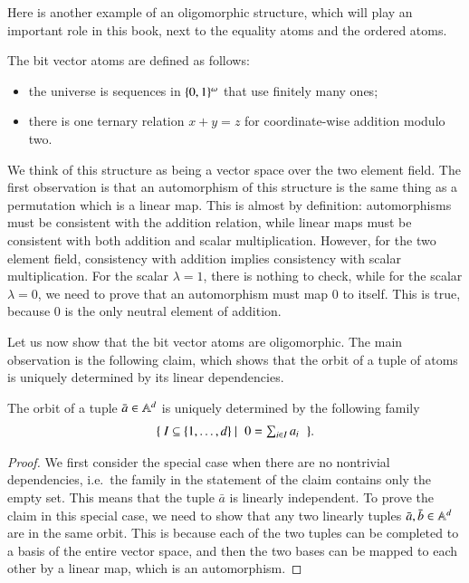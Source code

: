 Here is another example of an oligomorphic structure, which will play  an important role in this book, next to the equality atoms and the ordered atoms.
\begin{myexample}
	 \label{ex:bit-vector-atoms} 
	 The bit vector atoms are defined as follows: 
	\begin{itemize}
		\item the universe is sequences in $\{0,1\}^\omega$ that use finitely many ones;
		\item there is one ternary relation $x + y = z$ for coordinate-wise addition modulo two.
	\end{itemize}
	
	We think of this structure as being a vector space over the two element field. The first observation is that an automorphism of this structure is the same thing as a permutation which is a linear map. This is almost by definition: automorphisms must be consistent with the addition relation, while linear maps must be consistent with both addition and scalar multiplication. However, for the two element field, consistency with addition implies consistency with scalar multiplication. For the scalar $\lambda  = 1$, there is nothing to check, while for the scalar $\lambda = 0$, we need to prove that an automorphism must map $0$ to itself. This is true, because $0$ is the only neutral element of addition. 
	
	Let us now show that the bit vector atoms are oligomorphic. The main observation is the following claim, which shows that the orbit of a tuple of atoms is uniquely determined by its linear dependencies.
	\begin{claim}\label{claim:bit-vector-orbit-dependencies}
		The orbit of a tuple $\bar a \in \mathbb A^d$ is uniquely determined by the following family
		\begin{align*}
		\setbuild { I \subseteq \set{1,\ldots,d}}{$0 = \sum_{i \in I} a_i$}.
		\end{align*}
	\end{claim}
	\begin{proof}
		We first consider the special case when there are no nontrivial dependencies, i.e.~the family in the statement of the claim contains only the empty set. This means that the tuple $\bar a$ is linearly independent. To prove the claim in this special case, we need to show that any two linearly  tuples $\bar a , \bar b \in \mathbb A^d$ are in the same orbit. This is because each of the two tuples can be completed to a basis of the entire vector space, and then the two bases can be mapped to each other by a linear map, which is an automorphism.


\end{proof}
\end{myexample}
